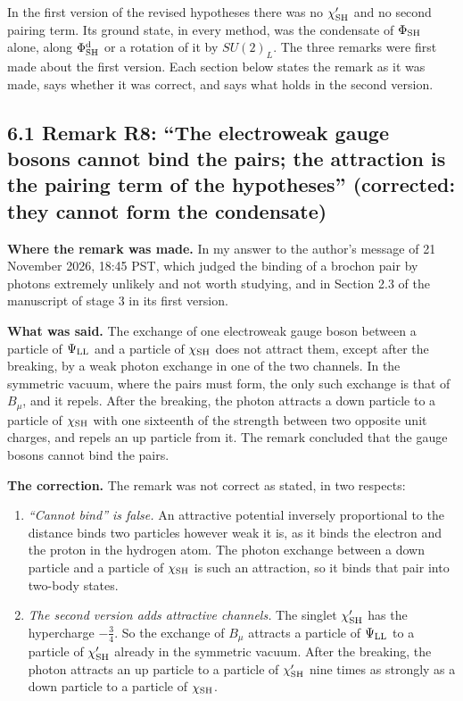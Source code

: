 \documentclass[
  10pt,
]{article}
\providecommand{\tightlist}{%
  \setlength{\itemsep}{0pt}\setlength{\parskip}{0pt}}
\begin{document}
In the first version of the revised hypotheses there was no
\(\chi'_{\rm SH}\) and no second pairing term. Its ground state, in
every method, was the condensate of \(\Phi_{\rm SH}\) alone, along
\(\Phi^{\rm d}_{\rm SH}\) or a rotation of it by \(SU(2)_L\). The three
remarks were first made about the first version. Each section below
states the remark as it was made, says whether it was correct, and says
what holds in the second version.

\hypertarget{remark-r8-the-electroweak-gauge-bosons-cannot-bind-the-pairs-the-attraction-is-the-pairing-term-of-the-hypotheses-corrected-they-cannot-form-the-condensate}{%
\subsection{6.1 Remark R8: ``The electroweak gauge bosons cannot bind
the pairs; the attraction is the pairing term of the hypotheses''
(corrected: they cannot form the
condensate)}\label{remark-r8-the-electroweak-gauge-bosons-cannot-bind-the-pairs-the-attraction-is-the-pairing-term-of-the-hypotheses-corrected-they-cannot-form-the-condensate}}

\textbf{Where the remark was made.} In my answer to the author's message
of 21 November 2026, 18:45 PST, which judged the binding of a brochon
pair by photons extremely unlikely and not worth studying, and in
Section 2.3 of the manuscript of stage 3 in its first version.

\textbf{What was said.} The exchange of one electroweak gauge boson
between a particle of \(\Psi_{\rm LL}\) and a particle of
\(\chi_{\rm SH}\) does not attract them, except after the breaking, by a
weak photon exchange in one of the two channels. In the symmetric
vacuum, where the pairs must form, the only such exchange is that of
\(B_\mu\), and it repels. After the breaking, the photon attracts a down
particle to a particle of \(\chi_{\rm SH}\) with one sixteenth of the
strength between two opposite unit charges, and repels an up particle
from it. The remark concluded that the gauge bosons cannot bind the
pairs.

\textbf{The correction.} The remark was not correct as stated, in two
respects:

\begin{enumerate}
\def\labelenumi{\arabic{enumi}.}
\tightlist
\item
  \emph{``Cannot bind'' is false.} An attractive potential inversely
  proportional to the distance binds two particles however weak it is,
  as it binds the electron and the proton in the hydrogen atom. The
  photon exchange between a down particle and a particle of
  \(\chi_{\rm SH}\) is such an attraction, so it binds that pair into
  two-body states.
\item
  \emph{The second version adds attractive channels.} The singlet
  \(\chi'_{\rm SH}\) has the hypercharge \(-\tfrac34\). So the exchange
  of \(B_\mu\) attracts a particle of \(\Psi_{\rm LL}\) to a particle of
  \(\chi'_{\rm SH}\) already in the symmetric vacuum. After the
  breaking, the photon attracts an up particle to a particle of
  \(\chi'_{\rm SH}\) nine times as strongly as a down particle to a
  particle of \(\chi_{\rm SH}\).
\end{enumerate}
\end{document}
